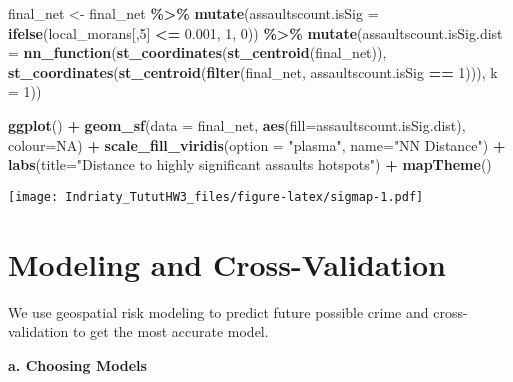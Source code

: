 \documentclass[
]{article}
\newenvironment{Shaded}{\begin{snugshade}}{\end{snugshade}}
\newcommand{\AttributeTok}[1]{\textcolor[rgb]{0.13,0.29,0.53}{#1}}
\newcommand{\ConstantTok}[1]{\textcolor[rgb]{0.56,0.35,0.01}{#1}}
\newcommand{\DecValTok}[1]{\textcolor[rgb]{0.00,0.00,0.81}{#1}}
\newcommand{\FloatTok}[1]{\textcolor[rgb]{0.00,0.00,0.81}{#1}}
\newcommand{\FunctionTok}[1]{\textcolor[rgb]{0.13,0.29,0.53}{\textbf{#1}}}
\newcommand{\NormalTok}[1]{#1}
\newcommand{\OtherTok}[1]{\textcolor[rgb]{0.56,0.35,0.01}{#1}}
\newcommand{\SpecialCharTok}[1]{\textcolor[rgb]{0.81,0.36,0.00}{\textbf{#1}}}
\newcommand{\StringTok}[1]{\textcolor[rgb]{0.31,0.60,0.02}{#1}}
\begin{document}
\begin{Shaded}
\begin{Highlighting}[]
\NormalTok{final\_net }\OtherTok{\textless{}{-}}\NormalTok{ final\_net }\SpecialCharTok{\%\textgreater{}\%} 
  \FunctionTok{mutate}\NormalTok{(}\AttributeTok{assaultscount.isSig =} 
           \FunctionTok{ifelse}\NormalTok{(local\_morans[,}\DecValTok{5}\NormalTok{] }\SpecialCharTok{\textless{}=} \FloatTok{0.001}\NormalTok{, }\DecValTok{1}\NormalTok{, }\DecValTok{0}\NormalTok{)) }\SpecialCharTok{\%\textgreater{}\%}
  \FunctionTok{mutate}\NormalTok{(}\AttributeTok{assaultscount.isSig.dist =} 
           \FunctionTok{nn\_function}\NormalTok{(}\FunctionTok{st\_coordinates}\NormalTok{(}\FunctionTok{st\_centroid}\NormalTok{(final\_net)),}
                       \FunctionTok{st\_coordinates}\NormalTok{(}\FunctionTok{st\_centroid}\NormalTok{(}\FunctionTok{filter}\NormalTok{(final\_net, }
\NormalTok{                                           assaultscount.isSig }\SpecialCharTok{==} \DecValTok{1}\NormalTok{))), }
                       \AttributeTok{k =} \DecValTok{1}\NormalTok{))}

\FunctionTok{ggplot}\NormalTok{() }\SpecialCharTok{+}
      \FunctionTok{geom\_sf}\NormalTok{(}\AttributeTok{data =}\NormalTok{ final\_net, }\FunctionTok{aes}\NormalTok{(}\AttributeTok{fill=}\NormalTok{assaultscount.isSig.dist), }\AttributeTok{colour=}\ConstantTok{NA}\NormalTok{) }\SpecialCharTok{+}
      \FunctionTok{scale\_fill\_viridis}\NormalTok{(}\AttributeTok{option =} \StringTok{"plasma"}\NormalTok{, }\AttributeTok{name=}\StringTok{"NN Distance"}\NormalTok{) }\SpecialCharTok{+}
      \FunctionTok{labs}\NormalTok{(}\AttributeTok{title=}\StringTok{"Distance to highly significant assaults hotspots"}\NormalTok{) }\SpecialCharTok{+}
      \FunctionTok{mapTheme}\NormalTok{()}
\end{Highlighting}
\end{Shaded}

\texttt{[image: Indriaty\_TututHW3\_files/figure-latex/sigmap-1.pdf]}

\section{Modeling and
Cross-Validation}\label{modeling-and-cross-validation}

We use geospatial risk modeling to predict future possible crime and
cross-validation to get the most accurate model.

\textbf{a. Choosing Models}
\end{document}
